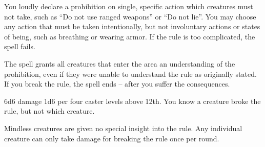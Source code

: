 \begin{spellheader}
\end{spellheader}
\begin{spellcontent}
    \spelleffect You loudly declare a prohibition on single, specific action which creatures must not take, such as ``Do not use ranged weapons'' or ``Do not lie''. You may choose any action that must be taken intentionally, but not involuntary actions or states of being, such as breathing or wearing armor. If the rule is too complicated, the spell fails.

    The spell grants all creatures that enter the area an understanding of the prohibition, even if they were unable to understand the rule as originally stated. If you break the rule, the spell ends -- after you suffer the consequences.
    \spelldur{\durshort}
\end{spellcontent}
\begin{spellsubcontent}
    \begin{spelltargetinginfo}
    \end{spelltargetinginfo}
    \begin{spelleffects}
        \spelleffect 6d6 damage \add 1d6 per four caster levels above 12th. You know a creature broke the rule, but not which creature.
    \end{spelleffects}
\end{spellsubcontent}
\begin{spellfooter}
    \spellnotes Mindless creatures are given no special insight into the rule. Any individual creature can only take damage for breaking the rule once per round.
\end{spellfooter}


